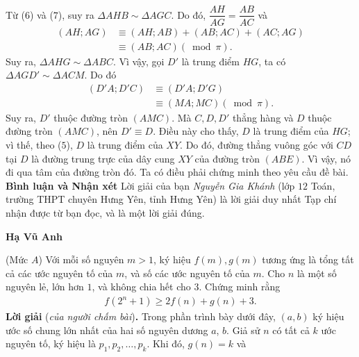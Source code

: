 \begin{multicols}{2}
\begin{align*}
	\end{align*}
	Từ ($6$) và ($7$), suy ra $\Delta AHB \sim  \Delta AGC$.
	\vskip 0.05cm
	Do đó, $\dfrac{{AH}}{{AG}} = \dfrac{{AB}}{{AC}}$  và
	\begin{align*}
		\left(\! {AH;AG} \!\right) &\equiv \left(\! {AH;AB} \!\right) \!+\! \left(\! {AB;AC} \!\right) \!+\! \left(\! {AC;AG} \!\right)\\
		& \equiv \left( {AB;AC} \right)\left( {\bmod \pi } \right).
	\end{align*}
	Suy ra, $\Delta AHG \sim \Delta ABC$.
	\vskip 0.05cm
	Vì vậy, gọi $D'$  là trung điểm $HG$, ta có $\Delta AGD' \sim \Delta ACM$. Do đó
	\begin{align*}
		\left( {D'A;D'C} \right) &\equiv \left( {D'A;D'G} \right) \\
		&\equiv \left( {MA;MC} \right)\left( {\bmod \pi } \right).	
	\end{align*}
	Suy ra, $D'$ thuộc đường tròn $(AMC)$. Mà $C, D, D'$  thẳng hàng và $D$ thuộc đường tròn $(AMC)$, nên $D' \equiv D$.  Điều này cho thấy, $D$ là trung điểm của $HG$; vì thế, theo ($5$), $D$ là trung điểm của $XY$. Do đó, đường thẳng vuông góc với $CD$ tại $D$ là đường trung trực của dây cung $XY$ của đường tròn $(ABE)$. Vì vậy, nó đi qua tâm của đường tròn đó. Ta có điều phải chứng minh theo yêu cầu đề bài.
	\vskip 0.05cm
	\textbf{\color{thachthuctoanhoc}Bình luận và Nhận xét}
	\vskip 0.05cm
	Lời giải của bạn \textit{Nguyễn Gia Khánh} (lớp $12$ Toán, trường THPT chuyên Hưng Yên, tỉnh Hưng Yên) là lời giải duy nhất Tạp chí nhận được từ bạn đọc, và là một lời giải đúng.
	\begin{flushright}
		\textbf{\color{thachthuctoanhoc}Hạ Vũ Anh}
	\end{flushright}
	{}
	(Mức $A$) Với mỗi số nguyên $m > 1$, ký hiệu $f(m), g(m)$  tương ứng là tổng tất cả các ước nguyên tố của $m$, và số các ước nguyên tố của $m$. Cho $n$ là một số nguyên lẻ, lớn hơn $1$, và không chia hết cho $3$. Chứng minh rằng
	\begin{align*}
		f\left( {{2^n} + 1} \right) \ge 2f\left( n \right) + g\left( n \right) + 3.
	\end{align*}
	\textbf{\color{thachthuctoanhoc}Lời giải} (\textit{của người chấm bài})\textbf{\color{thachthuctoanhoc}.}
	\vskip 0.05cm
	Trong phần trình bày dưới đây, $(a, b)$ ký hiệu ước số chung lớn nhất của hai số nguyên dương $a$, $b$.
	\vskip 0.05cm
	Giả sử $n$ có tất cả $k$ ước nguyên tố, ký hiệu là ${p_1},{p_2}, \ldots ,{p_k}.$
	\vskip 0.05cm 
	Khi đó, $g\left( n \right) = k$  và 

\end{multicols}
